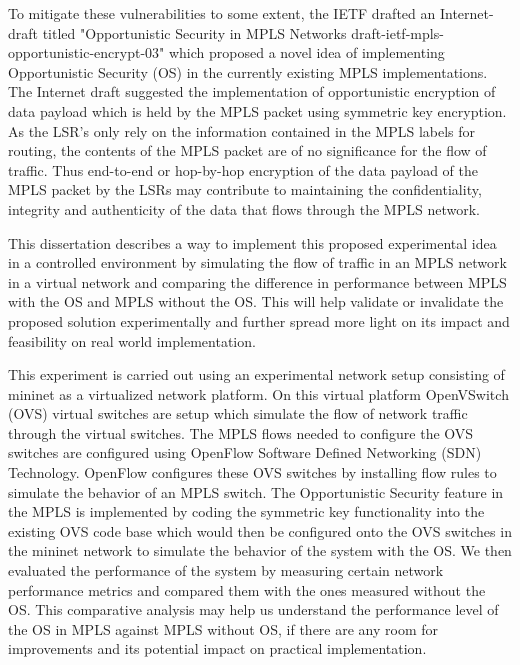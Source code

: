 \documentclass[a4paper, 12pt, oneside]{report}         %
\begin{document}
\begin{thesissummary}
    To mitigate these vulnerabilities to some extent, the IETF drafted an Internet-draft titled "Opportunistic Security in MPLS Networks draft-ietf-mpls-opportunistic-encrypt-03" which proposed a novel idea of implementing Opportunistic Security (OS) in the currently existing MPLS implementations. The Internet draft suggested the implementation of opportunistic encryption of data payload which is held by the MPLS packet using symmetric key encryption. As the LSR's only rely on the information contained in the MPLS labels for routing, the contents of the MPLS packet are of no significance for the flow of traffic. Thus end-to-end or hop-by-hop encryption of the data payload of the MPLS packet by the LSRs may contribute to maintaining the confidentiality, integrity and authenticity of the data that flows through the MPLS network.
    
    This dissertation describes a way to implement this proposed experimental idea in a controlled environment by simulating the flow of traffic in an MPLS network in a virtual network and comparing the difference in performance between MPLS with the OS and MPLS without the OS. This will help validate or invalidate the proposed solution experimentally and further spread more light on its impact and feasibility on real world implementation.
    
    This experiment is carried out using an experimental network setup consisting of mininet as a virtualized network platform. On this virtual platform OpenVSwitch (OVS) virtual switches are setup which simulate the flow of network traffic through the virtual switches. The MPLS flows needed to configure the OVS switches are configured using OpenFlow Software Defined Networking (SDN) Technology. OpenFlow configures these OVS switches by installing flow rules to simulate the behavior of an MPLS switch. The Opportunistic Security feature in the MPLS is implemented by coding the symmetric key functionality into the existing OVS code base which would then be configured onto the OVS switches in the mininet network to simulate the behavior of the system with the OS. We then evaluated the performance of the system by measuring certain network performance metrics and compared them with the ones measured without the OS. This comparative analysis may help us understand the performance level of the OS in MPLS against MPLS without OS, if there are any room for improvements and its potential impact on practical implementation. 
 \end{thesissummary}
\end{document}
